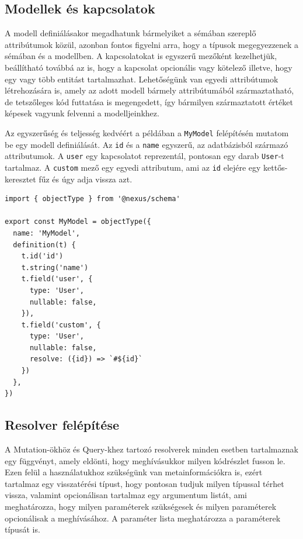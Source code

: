 \subsection{Modellek és kapcsolatok}
A modell definiálásakor megadhatunk bármelyiket a sémában szereplő attribútumok közül, azonban fontos figyelni arra, hogy a típusok megegyezzenek a sémában és a modellben.
A kapcsolatokat is egyszerű mezőként kezelhetjük, beállítható továbbá az is, hogy a kapcsolat opcionális vagy kötelező illetve, hogy egy vagy több entitást tartalmazhat.
Lehetőségünk van egyedi attribútumok létrehozására is, amely az adott modell bármely attribútumából származtatható, de tetszőleges kód futtatása is megengedett, így bármilyen származtatott értéket képesek vagyunk felvenni a modelljeinkhez.

Az egyszerűség és teljesség kedvéért a példában a \lstinline|MyModel| felépítésén mutatom be egy modell definiálását.
Az \lstinline|id| és a \lstinline|name| egyszerű, az adatbázisból származó attributumok. A \lstinline|user| egy kapcsolatot reprezentál, pontosan egy darab \lstinline|User|-t tartalmaz. 
A \lstinline|custom| mező egy egyedi attributum, ami az \lstinline|id| elejére egy kettős-keresztet fűz és úgy adja vissza azt.
\begin{lstlisting}[style=ES6, caption={Példa model}]
import { objectType } from '@nexus/schema'

export const MyModel = objectType({
  name: 'MyModel',
  definition(t) {
    t.id('id')
    t.string('name')
    t.field('user', {
      type: 'User',
      nullable: false,
    }),
    t.field('custom', {
      type: 'User',
      nullable: false,
      resolve: ({id}) => `#${id}`
    })
  },
})
\end{lstlisting}

\subsection{Resolver felépítése}
A Mutation-ökhöz és Query-khez tartozó resolverek minden esetben tartalmaznak egy függvényt, amely eldönti, hogy meghívásukkor milyen kódrészlet fusson le.
Ezen felül a használatukhoz szükségünk van metainformációkra is, ezért tartalmaz egy visszatérési típust, hogy pontosan tudjuk milyen típussal térhet vissza, valamint opcionálisan tartalmaz egy argumentum listát, ami meghatározza, hogy milyen paraméterek szükségesek és milyen paraméterek opcionálisak a meghívásához.
A paraméter lista meghatározza a paraméterek típusát is.

